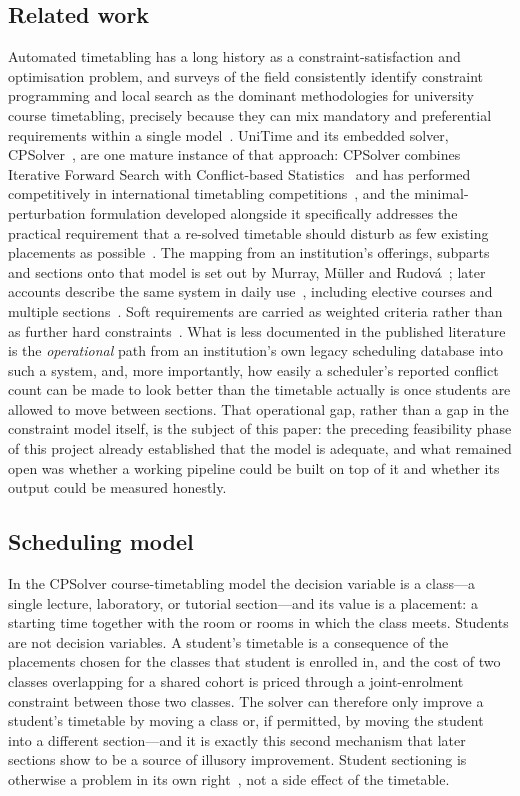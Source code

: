 \documentclass[journal]{IEEEtran}
\begin{document}
\subsection{Related work}
Automated timetabling has a long history as a constraint-satisfaction and optimisation problem, and surveys of the field consistently identify constraint programming and local search as the dominant methodologies for university course timetabling, precisely because they can mix mandatory and preferential requirements within a single model~\cite{schaerf1999survey}. UniTime and its embedded solver, CPSolver~\cite{cpsolver}, are one mature instance of that approach: CPSolver combines Iterative Forward Search with Conflict-based Statistics~\cite{muller2004constraint} and has performed competitively in international timetabling competitions~\cite{muller2009itc,muller2025itc}, and the minimal-perturbation formulation developed alongside it specifically addresses the practical requirement that a re-solved timetable should disturb as few existing placements as possible~\cite{muller2007minimal}. The mapping from an institution's offerings, subparts and sections onto that model is set out by Murray, M\"uller and Rudov\'a~\cite{murray2007modeling}; later accounts describe the same system in daily use~\cite{rudova2011complex}, including elective courses and multiple sections~\cite{muller2016curriculum}. Soft requirements are carried as weighted criteria rather than as further hard constraints~\cite{rudova2003soft}. What is less documented in the published literature is the \emph{operational} path from an institution's own legacy scheduling database into such a system, and, more importantly, how easily a scheduler's reported conflict count can be made to look better than the timetable actually is once students are allowed to move between sections. That operational gap, rather than a gap in the constraint model itself, is the subject of this paper: the preceding feasibility phase of this project already established that the model is adequate, and what remained open was whether a working pipeline could be built on top of it and whether its output could be measured honestly.

\subsection{Scheduling model}
In the CPSolver course-timetabling model the decision variable is a class---a single lecture, laboratory, or tutorial section---and its value is a placement: a starting time together with the room or rooms in which the class meets. Students are not decision variables. A student's timetable is a consequence of the placements chosen for the classes that student is enrolled in, and the cost of two classes overlapping for a shared cohort is priced through a joint-enrolment constraint between those two classes. The solver can therefore only improve a student's timetable by moving a class or, if permitted, by moving the student into a different section---and it is exactly this second mechanism that later sections show to be a source of illusory improvement. Student sectioning is otherwise a problem in its own right~\cite{muller2010sectioning}, not a side effect of the timetable.
\end{document}
